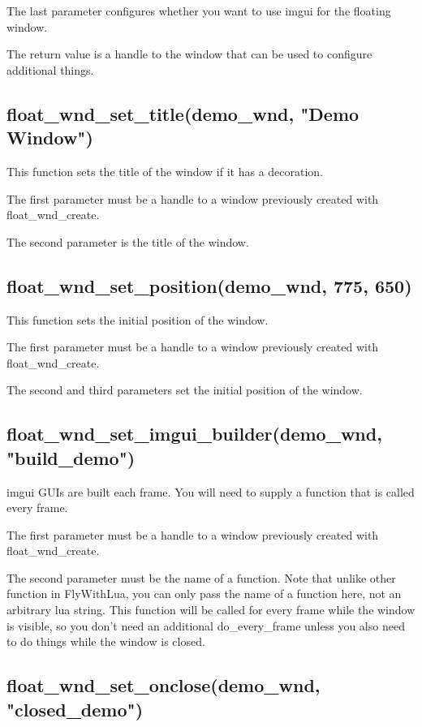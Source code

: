 \documentclass[11pt,parskip=half,a4paper]{scrartcl}
\begin{document}
The last parameter configures whether you want to use imgui for the floating window.

The return value is a handle to the window that can be used to configure additional things.

\subsection{float\_wnd\_set\_title(demo\_wnd, "Demo Window")}

This function sets the title of the window if it has a decoration.

The first parameter must be a handle to a window previously created with float\_wnd\_create.

The second parameter is the title of the window.

\subsection{float\_wnd\_set\_position(demo\_wnd, 775, 650)}

This function sets the initial position of the window.

The first parameter must be a handle to a window previously created with float\_wnd\_create.

The second and third parameters set the initial position of the window.

\subsection{float\_wnd\_set\_imgui\_builder(demo\_wnd, "build\_demo")}

imgui GUIs are built each frame. You will need to supply a function that is called every frame.

The first parameter must be a handle to a window previously created with float\_wnd\_create.

The second parameter must be the name of a function. Note that unlike other function in FlyWithLua, you
can only pass the name of a function here, not an arbitrary lua string. This function will be called for
every frame while the window is visible, so you don't need an additional do\_every\_frame unless you
also need to do things while the window is closed.

\subsection{float\_wnd\_set\_onclose(demo\_wnd, "closed\_demo")}
\end{document}
